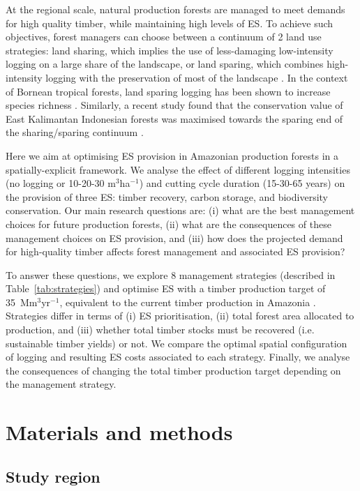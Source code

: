 \documentclass{article}
\begin{document}
At the regional scale, natural production forests are managed to meet demands for high quality timber, while maintaining high levels of ES. To achieve such objectives, forest managers can choose between a continuum of 2 land use strategies: land sharing, which implies the use of less-damaging low-intensity logging on a large share of the landscape, or land sparing, which combines high-intensity logging with the preservation of most of the landscape \cite{Green2005}. In the context of Bornean tropical forests, land sparing logging has been shown to increase species richness \cite{Edwards2014}. Similarly, a recent study found that the conservation value of East Kalimantan Indonesian forests was maximised towards the sparing end of the sharing/sparing continuum \cite{Runting2018}.

Here we aim at optimising ES provision in Amazonian production forests in a spatially-explicit framework. We analyse the effect of different logging intensities (no logging or 10-20-30 m$^3$ha$^{-1}$) and cutting cycle duration (15-30-65 years) on the provision of three ES: timber recovery, carbon storage, and biodiversity conservation. Our main research questions are: (i) what are the best management choices for future production forests, (ii) what are the consequences of these management choices on ES provision, and (iii) how does the projected demand for high-quality timber affects forest management and associated ES provision? 

To answer these questions, we explore 8 management strategies (described in Table~\ref{tab:strategies}) and optimise ES with a timber production target of 35~Mm$^3$yr$^{-1}$, equivalent to the current timber production in Amazonia \cite{Lentini2005}. Strategies differ in terms of (i) ES prioritisation, (ii) total forest area allocated to production, and (iii) whether total timber stocks must be recovered (i.e. sustainable timber yields) or not. We compare the optimal spatial configuration of logging and resulting ES costs associated to each strategy. 
Finally, we analyse the consequences of changing the total timber production target depending on the management strategy.

\section{Materials and methods}

\subsection{Study region}
\end{document}
